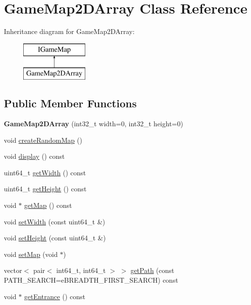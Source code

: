 \hypertarget{class_game_map2_d_array}{}\section{Game\+Map2\+D\+Array Class Reference}
\label{class_game_map2_d_array}
Inheritance diagram for Game\+Map2\+D\+Array\+:\begin{figure}[H]
\begin{center}
\leavevmode
\includegraphics[height=2.000000cm]{class_game_map2_d_array}
\end{center}
\end{figure}
\subsection*{Public Member Functions}
\begin{DoxyCompactItemize}
\item 
\hypertarget{class_game_map2_d_array_ace975540ab51f5abe09c26a1d45225e9}{}{\bfseries Game\+Map2\+D\+Array} (int32\+\_\+t width=0, int32\+\_\+t height=0)\label{class_game_map2_d_array_ace975540ab51f5abe09c26a1d45225e9}

\item 
void \hyperlink{class_game_map2_d_array_a931febc639363cadede9715622d0ce61}{create\+Random\+Map} ()
\item 
void \hyperlink{class_game_map2_d_array_ae6bb6f71427a77c08b5ed5f2543f0232}{display} () const 
\item 
uint64\+\_\+t \hyperlink{class_game_map2_d_array_a9f4b509beaa837234e140e52c25a86ce}{get\+Width} () const 
\item 
uint64\+\_\+t \hyperlink{class_game_map2_d_array_a1c44c4778b3257aabacb844900840431}{get\+Height} () const 
\item 
void $\ast$ \hyperlink{class_game_map2_d_array_a3787853c82e770dadd05c735286662ba}{get\+Map} () const 
\item 
void \hyperlink{class_game_map2_d_array_a1590aef3da91ad34b2ddbffd065613a8}{set\+Width} (const uint64\+\_\+t \&)
\item 
void \hyperlink{class_game_map2_d_array_acd607e52b75525dd9d9d056c423d3ff5}{set\+Height} (const uint64\+\_\+t \&)
\item 
void \hyperlink{class_game_map2_d_array_ac7c514792963d245bbb46bce5772adec}{set\+Map} (void $\ast$)
\item 
vector$<$ pair$<$ int64\+\_\+t, int64\+\_\+t $>$ $>$ \hyperlink{class_game_map2_d_array_a8cb18e13bd1b82fe6b4b972fd62c1d86}{get\+Path} (const P\+A\+T\+H\+\_\+\+S\+E\+A\+R\+C\+H=e\+B\+R\+E\+A\+D\+T\+H\+\_\+\+F\+I\+R\+S\+T\+\_\+\+S\+E\+A\+R\+C\+H) const 
\item 
void $\ast$ \hyperlink{class_game_map2_d_array_a6f82f6373ab53b0dc0db27d03de02ff4}{get\+Entrance} () const 
\end{DoxyCompactItemize}
